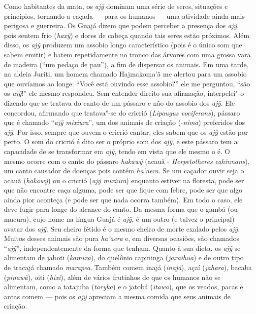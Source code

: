 Como habitantes da mata, os \emph{ajỹ} dominam uma série de seres,
situações e princípios, tornando a caçada --- para os humanos --- uma
atividade ainda mais perigosa e guerreira. Os Guajá dizem que podem
perceber a presença dos \emph{ajỹ}, pois sentem frio (\emph{haxỹ}) e
dores de cabeça quando tais seres estão próximos. Além disso, os
\emph{ajỹ} produzem um assobio longo característico (pois é o único som
que sabem emitir) e batem repetidamente no tronco das árvores com uma
grossa vara de madeira (``um pedaço de pau''), a fim de dispersar os
animais. Em uma tarde, na aldeia Juriti, um homem chamado Hajmakoma'ã me
alertou para um assobio que ouvíamos ao longe: ``Você está ouvindo esse
assobio?'' ele me perguntou, ``são os \emph{ajỹ}!'' ele mesmo respondeu.
Sem entender direito sua afirmação, interpelei"-o dizendo que se tratava
do canto de um pássaro e não do assobio dos \emph{ajỹ.} Ele concordou,
afirmando que tratava"-se do cricrió (\emph{Lipaugus vociferans}),
pássaro que é chamado ``\emph{ajỹ mixiura}'', um dos animais de criação
(-\emph{nima}) preferidos dos \emph{ajỹ}. Por isso, sempre que ouvem o
cricrió cantar, eles sabem que os \emph{ajỹ} estão por perto. O som do
cricrió é dito ser o próprio som dos \emph{ajỹ}, e este pássaro tem a
capacidade de se transformar em \emph{ajỹ}, tendo em vista que ele mesmo
o é. O mesmo ocorre com o canto do pássaro \emph{hakawỹ} (acauã -
\emph{Herpetotheres cahinnans}), um canto causador de doenças pois
contém \emph{ha'aera}. Se um caçador ouvir seja o acauã (\emph{hakawỹ})
ou o cricrió (\emph{ajỹ mixiura}) enquanto estiver na floresta, pode ser
que não encontre caça alguma, pode ser que fique com febre, pode ser que
algo ainda pior aconteça (e pode ser que nada ocorra também). Em todo o
caso, ele deve fugir para longe do alcance do canto. Da mesma forma que
o gambá (ou mucura), cujo nome na língua Guajá é \emph{ajỹ,} é um outro
(e talvez o principal) avatar dos \emph{ajỹ}. Seu cheiro fétido é o
mesmo cheiro de morte exalado pelos \emph{ajỹ}. Muitos desses animais
são pura \emph{ha'aera} e, em diversas ocasiões, são chamados
``\emph{ajỹ}'', independentemente da forma que tenham. Quanto à sua dieta,
os \emph{ajỹ} se alimentam de jaboti (\emph{kamixa}), do quelônio
capininga (\emph{jaxaihua}) e de outro tipo de tracajá chamado
\emph{marapea}. Também comem inajá (\emph{inajã}), açaí (\emph{jahara}),
bacaba (\emph{pinawã}), oiti (\emph{hixi}), além de vários frutinhos de
que os humanos não se alimentam, como a tatajuba (\emph{taryka}) e o
jatobá (\emph{itawa}), que os veados, pacas e antas comem --- pois os
\emph{ajỹ} apreciam a mesma comida que seus animais de criação.

